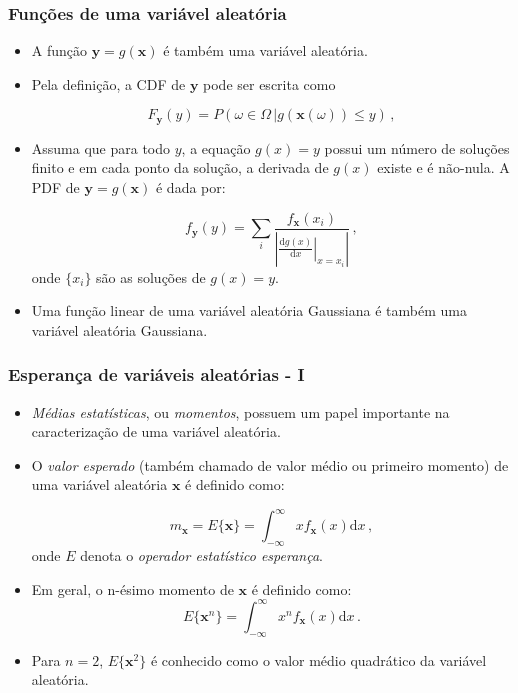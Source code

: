 \begin{frame}
    \frametitle{Funções de uma variável aleatória}

    \begin{itemize}
     \item A função $\mathbf{y} = g(\mathbf{x})$ é também uma variável aleatória.
      \item Pela definição, a CDF de $\mathbf{y}$ pode ser escrita como

      \begin{equation}
	  F_{\mathbf{y}}(y) = P(\omega \in \Omega \, | g(\mathbf{x}(\omega)) \leq y) \, ,
      \end{equation}

      \item Assuma que para todo $y$, a equação $g(x) = y$ possui um número de soluções finito e em cada ponto da solução, a derivada de $g(x)$ existe e é não-nula. A PDF de $\mathbf{y} = g(\mathbf{x})$ é dada por:

      \begin{equation}
	  f_{\mathbf{y}}(y) = \sum\limits_i \frac{f_{\mathbf{x}}(x_i)}{\left| \left. \frac{\mathrm{d}g(x)}{\mathrm{d}x} \right|_{x = x_i}  \right|} \, ,
      \end{equation}
      onde $\{x_i\}$ são as soluções de $g(x) = y$.
      \item Uma função linear de uma variável aleatória Gaussiana é também uma variável aleatória Gaussiana.

    \end{itemize}
   
\end{frame}

\begin{frame}
    \frametitle{Esperança de variáveis aleatórias - I}

    \begin{itemize}
     \item \textit{Médias estatísticas}, ou \textit{momentos}, possuem um papel importante na caracterização de uma variável aleatória.
     \item O \textit{valor esperado} (também chamado de valor médio ou primeiro momento) de uma variável aleatória $\mathbf{x}$ é definido como:

    \begin{equation}
	m_{\mathbf{x}} = E\{\mathbf{x}\} = \int_{-\infty}^{\infty} x f_{\mathbf{x}}(x) \mathrm{d}x \, ,
    \end{equation}
    onde $E$ denota o \textit{operador estatístico esperança}.
    \item Em geral, o n-ésimo momento de $\mathbf{x}$ é definido como:
    \begin{equation}
	E\{\mathbf{x}^n\} = \int_{-\infty}^{\infty} x^n f_{\mathbf{x}}(x) \mathrm{d}x \, .
    \end{equation}
    \item Para $n=2$, $E\{\mathbf{x}^2\}$ é conhecido como o valor médio quadrático da variável aleatória.
    \end{itemize}
   
\end{frame}

